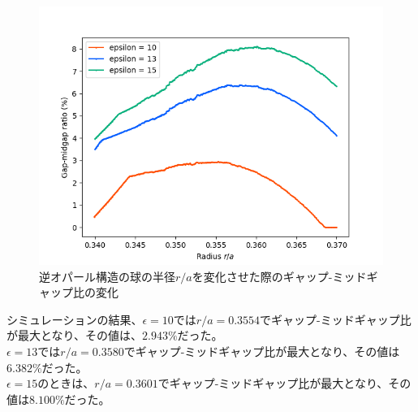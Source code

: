 \documentclass[platex,dvipdfmx]{jsreport}
\numberwithin{equation}{section}
\begin{document}
\begin{figure}[htbp]
  \centering
  \includegraphics[width=0.8\linewidth]{results/gap_midgap_ratio/inv_opals_detail.png}
  \caption{逆オパール構造の球の半径$r / a$を変化させた際のギャップ-ミッドギャップ比の変化}
  \label{fig:inv_opal_detail}
\end{figure}


シミュレーションの結果、$\epsilon = 10$では$r / a = 0.3554$でギャップ-ミッドギャップ比が最大となり、その値は、$2.943 \%$だった。\\
$\epsilon = 13$では$r / a = 0.3580$でギャップ-ミッドギャップ比が最大となり、その値は$6.382 \%$だった。\\
$\epsilon = 15$のときは、$r / a = 0.3601$でギャップ-ミッドギャップ比が最大となり、その値は$8.100 \%$だった。


\end{document}
